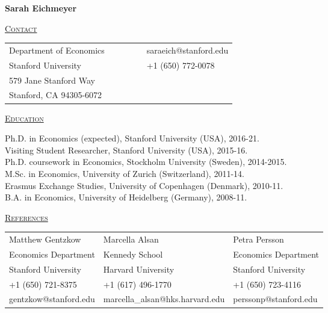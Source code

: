 \documentclass[letterpaper,11pt]{article}
\begin{document}
\begin{center}
\Large{\textbf{Sarah Eichmeyer}}
\end{center}



 \bigskip


 \underline {\textsc{Contact}}
 
\begin{tabular}{@{}l@{}cll@{}cl}
Department of Economics &&&&& saraeich@stanford.edu \\
Stanford University &&&&& +1 (650) 772-0078 \\
579 Jane Stanford Way && &&& \\
Stanford, CA 94305-6072 & & 
\end{tabular}

\bigskip
 
\underline {\textsc{Education}}

Ph.D. in Economics (expected), Stanford University (USA), 2016-21. \\
Visiting Student Researcher, Stanford University (USA), 2015-16. \\
Ph.D. coursework in Economics, Stockholm University (Sweden), 2014-2015. \\
M.Sc. in Economics, University of Zurich (Switzerland), 2011-14. \\
Erasmus Exchange Studies, University of Copenhagen (Denmark), 2010-11. \\
B.A. in Economics, University of Heidelberg (Germany), 2008-11.


\bigskip
 
\underline {\textsc{References}}



\begin{tabularx}{\textwidth}{@{}X@{}X@{}l}
Matthew Gentzkow & Marcella Alsan  & Petra Persson \\
Economics Department  & Kennedy School & Economics Department  \\
Stanford University & Harvard University & Stanford University \\ 
+1 (650) 721-8375 & +1 (617) 496-1770 & +1 (650) 723-4116  \\
gentzkow@stanford.edu & marcella\_alsan@hks.harvard.edu & perssonp@stanford.edu \\
\end{tabularx}

\bigskip
 
\end{document}
